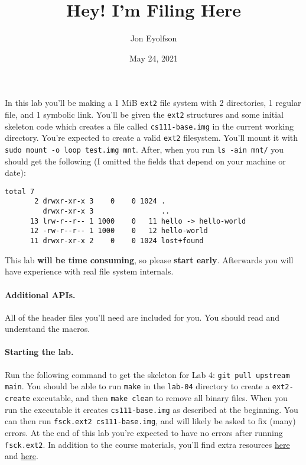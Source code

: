 

\title{Hey! I'm Filing Here}
\author{Jon Eyolfson}
\date{May 24, 2021}



\maketitle

In this lab you'll be making a 1 MiB \texttt{ext2} file system with 2
directories, 1 regular file, and 1 symbolic link.
You'll be given the \texttt{ext2} structures and some initial skeleton code
which creates a file called \texttt{cs111-base.img} in the current working
directory.
You're expected to create a valid \texttt{ext2} filesystem.
You'll mount it with \texttt{sudo mount -o loop test.img mnt}.
After, when you run \texttt{ls -ain mnt/} you should get the following
(I omitted the fields that depend on your machine or date):

\begin{lstlisting}
total 7
       2 drwxr-xr-x 3    0    0 1024 .
         drwxr-xr-x 3                ..
      13 lrw-r--r-- 1 1000    0   11 hello -> hello-world
      12 -rw-r--r-- 1 1000    0   12 hello-world
      11 drwxr-xr-x 2    0    0 1024 lost+found
\end{lstlisting}

This lab \textbf{will be time consuming}, so please \textbf{start early}.
Afterwards you will have experience with real file system internals.

\paragraph{Additional APIs.}

All of the header files you'll need are included for you.
You should read and understand the macros.

\paragraph{Starting the lab.}

Run the following command to get the skeleton for Lab 4:
\texttt{git pull upstream main}.
You should be able to run \texttt{make} in the \texttt{lab-04} directory to
create a \texttt{ext2-create} executable, and then \texttt{make clean}
to remove all binary files.
When you run the executable it creates \texttt{cs111-base.img} as described
at the beginning.
You can then run \lstinline|fsck.ext2 cs111-base.img|, and will likely be
asked to fix (many) errors.
At the end of this lab you're expected to have no errors after running
\lstinline|fsck.ext2|.
In addition to the course materials, you'll find extra resources
\href{http://www.nongnu.org/ext2-doc/ext2.html}{here} and
\href{http://www.science.smith.edu/~nhowe/262/oldlabs/ext2.html}{here}.

